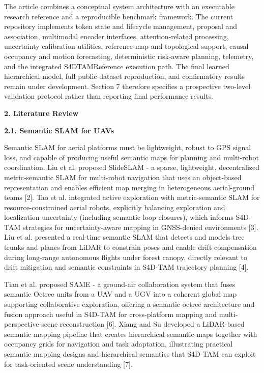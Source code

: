 \documentclass[
]{article}
\begin{document}
The article combines a conceptual system architecture with an executable
research reference and a reproducible benchmark framework. The current
repository implements token state and lifecycle management, proposal and
association, multimodal encoder interfaces, attention-related
processing, uncertainty calibration utilities, reference-map and
topological support, causal occupancy and motion forecasting,
deterministic risk-aware planning, telemetry, and the integrated
S4DTAMReference execution path. The final learned hierarchical model,
full public-dataset reproduction, and confirmatory results remain under
development. Section 7 therefore specifies a prospective two-level
validation protocol rather than reporting final performance results.

\textbf{2. Literature Review}

\textbf{2.1. Semantic SLAM for UAVs}

Semantic SLAM for aerial platforms must be lightweight, robust to GPS
signal loss, and capable of producing useful semantic maps for planning
and multi-robot coordination. Liu et al. proposed SlideSLAM - a sparse,
lightweight, decentralized metric-semantic SLAM for multi-robot
navigation that uses an object-based representation and enables
efficient map merging in heterogeneous aerial-ground teams {[}2{]}. Tao
et al. integrated active exploration with metric-semantic SLAM for
resource-constrained aerial robots, explicitly balancing exploration and
localization uncertainty (including semantic loop closures), which
informs S4D-TAM strategies for uncertainty-aware mapping in GNSS-denied
environments {[}3{]}. Liu et al. presented a real-time semantic SLAM
that detects and models tree trunks and planes from LiDAR to constrain
poses and enable drift compensation during long-range autonomous flights
under forest canopy, directly relevant to drift mitigation and semantic
constraints in S4D-TAM trajectory planning {[}4{]}.

Tian et al. proposed SAME - a ground-air collaboration system that fuses
semantic Octree units from a UAV and a UGV into a coherent global map
supporting collaborative exploration, offering a semantic octree
architecture and fusion approach useful in S4D-TAM for cross-platform
mapping and multi-perspective scene reconstruction {[}6{]}. Xiang and Su
developed a LiDAR-based semantic mapping pipeline that creates
hierarchical semantic maps together with occupancy grids for navigation
and task adaptation, illustrating practical semantic mapping designs and
hierarchical semantics that S4D-TAM can exploit for task-oriented scene
understanding {[}7{]}.
\end{document}
